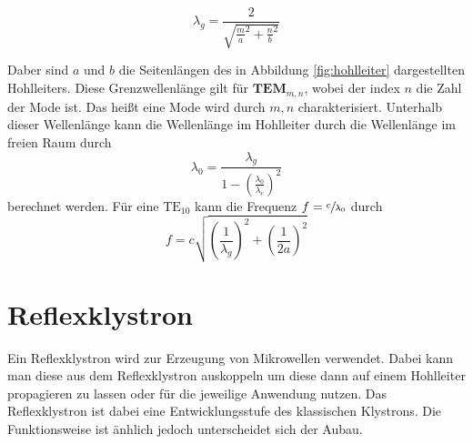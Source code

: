 \begin{equation}
              \label{eqn:lambda_g}
              \lambda_g = \frac{2}{\sqrt{\frac{m}{a}^2+\frac{n}{b}^2}}%
\end{equation}

Daber sind $a$ und $b$ die Seitenlängen des in Abbildung \ref{fig:hohlleiter} dargestellten Hohlleiters. Diese Grenzwellenlänge gilt für $\textbf{TEM}_{m,n}$, wobei der index $n$ die Zahl 
der Mode ist. Das heißt eine Mode wird durch $m,n$ charakterisiert. Unterhalb dieser Wellenlänge kann die Wellenlänge im Hohlleiter durch die Wellenlänge im freien Raum durch 
\begin{equation}
              \label{eqn:lambda_g}
              \lambda_0 = \frac{\lambda_g}{1-\left(\frac{\lambda_0}{\lambda_c}\right)^2}
\end{equation}
berechnet werden. 
Für eine $\mathrm{TE}_{10}$ kann die Frequenz $f = \sfrac{c}{\lambda_0}$ durch 
\begin{equation}
              \label{eqn:TE01}
              f = c\sqrt{\left(\frac{1}{\lambda_g}\right)^2+\left(\frac{1}{2a}\right)^2}
\end{equation}


\section{Reflexklystron}
\label{sec:reflexklystron}
Ein Reflexklystron wird zur Erzeugung von Mikrowellen verwendet. Dabei kann man diese aus dem Reflexklystron auskoppeln um diese dann auf einem Hohlleiter propagieren zu lassen oder 
für die jeweilige Anwendung nutzen. Das Reflexklystron ist dabei eine Entwicklungsstufe des klassischen Klystrons. Die Funktionsweise ist änhlich jedoch unterscheidet sich der Aubau.
